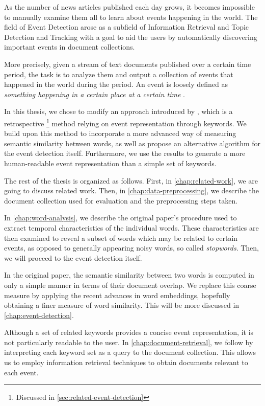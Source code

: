 As the number of news articles published each day grows, it becomes impossible to manually examine them all to learn about events happening in the world. The field of Event Detection arose as a subfield of Information Retrieval \citep{information-retrieval-2, information-retrieval} and Topic Detection and Tracking \citep{tdt, tdt-2} with a goal to aid the users by automatically discovering important events in document collections.

More precisely, given a stream of text documents published over a certain time period, the task is to analyze them and output a collection of events that happened in the world during the period. An event is loosely defined as \textit{something happening in a certain place at a certain time} \citep{retrospective-online-study}.

In this thesis, we chose to modify an approach introduced by \cite{event-detection}, which is a retrospective \footnote{Discussed in \autoref{sec:related-event-detection}} method relying on event representation through keywords. We build upon this method to incorporate a more advanced way of measuring semantic similarity between words, as well as propose an alternative algorithm for the event detection itself. Furthermore, we use the results to generate a more human-readable event representation than a simple set of keywords.

The rest of the thesis is organized as follows. First, in \autoref{chap:related-work}, we are going to discuss related work. Then, in \autoref{chap:data-preprocessing}, we describe the document collection used for evaluation and the preprocessing steps taken.

In \autoref{chap:word-analysis}, we describe the original paper's procedure used to extract temporal characteristics of the individual words. These characteristics are then examined to reveal a subset of words which may be related to certain events, as opposed to generally appearing noisy words, so called \textit{stopwords}. Then, we will proceed to the event detection itself.

In the original paper, the semantic similarity between two words is computed in only a simple manner in terms of their document overlap. We replace this coarse measure by applying the recent advances in word embeddings, hopefully obtaining a finer measure of word similarity. This will be more discussed in \autoref{chap:event-detection}.

Although a set of related keywords provides a concise event representation, it is not particularly readable to the user. In \autoref{chap:document-retrieval}, we follow by interpreting each keyword set as a query to the document collection. This allows us to employ information retrieval techniques to obtain documents relevant to each event.

